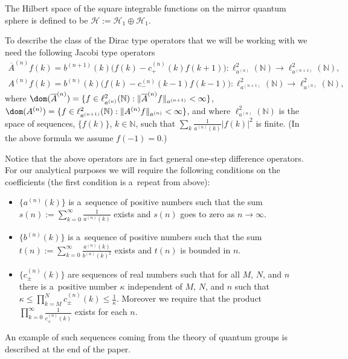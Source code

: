 The Hilbert space of the square integrable functions on the mirror quantum sphere is def\/ined to be $\mathcal{H}:=
\mathcal{H}_1\oplus \mathcal{H}_1$.

To describe the class of the Dirac type operators that we will be working with we need the following Jacobi type
operators
\begin{gather*}
\overline{A}^{(n)}f(k) = b^{(n+1)}(k)\Big(f(k) - c_+^{(n)}(k)f(k+1)\Big): \ell_{a^{(n)}}^2({\mathbb N})\to
\ell_{a^{(n+1)}}^2({\mathbb N}),
\\
A^{(n)}f(k) = b^{(n)}(k)\Big(f(k) - c_-^{(n)}(k-1)f(k-1)\Big): \ell_{a^{(n+1)}}^2({\mathbb N})\to
\ell_{a^{(n)}}^2({\mathbb N}),
\end{gather*}
where $\dom(\overline{A}^{(n)}) = \{f\in \ell_{a^{(n)}}^2({\mathbb N}):
\|\overline{A}^{(n)}f\|_{a^{(n+1)}}<\infty\}$, $\dom(A^{(n)}) = \{f\in \ell_{a^{(n+1)}}^2({\mathbb N}):
\|A^{(n)}f\|_{a^{(n)}}<\infty\}$, and where $\ell_{a^{(n)}}^2({\mathbb N})$ is the space of sequences, $\{f(k)\}$,
$k\in{\mathbb N}$, such that $\sum\limits_k \frac{1}{a^{(n)}(k)}|f(k)|^2$ is f\/inite.
(In the above formula we assume $f(-1)=0$.)

Notice that the above operators are in fact general one-step dif\/ference operators.
For our analytical purposes we will require the following conditions on the coef\/f\/icients
(the f\/irst condition is a~repeat from above):
\begin{itemize}\itemsep=0pt
\item
$\{a^{(n)}(k)\}$ is a~sequence of positive numbers such that the sum $s(n):=\sum\limits_{k=0}^\infty
\frac{1}{a^{(n)}(k)}$ exists and $s(n)$ goes to zero as $n\to\infty$.

\item
$\{b^{(n)}(k)\}$ is a~sequence of positive numbers such that the sum $t(n):= \sum\limits_{k=0}^\infty
\frac{a^{(n)}(k)}{b^{(n)}(k)^2}$ exists and $t(n)$ is bounded in $n$.

\item
$\{c_{\pm}^{(n)}(k)\}$ are sequences of real numbers such that for all $M$, $N$, and $n$ there is a~positive number
$\kappa$ independent of $M$, $N$, and $n$ such that $\kappa \le \prod\limits_{k=M}^N c_{\pm}^{(n)}(k) \le
\frac{1}{\kappa}$.
Moreover we require that the product $\prod\limits_{k=0}^\infty \frac{1}{c_{\pm}^{(n)}(k)}$ exists for each $n$.
\end{itemize}

An example of such sequences coming from the theory of quantum groups is described at the end of the paper.

